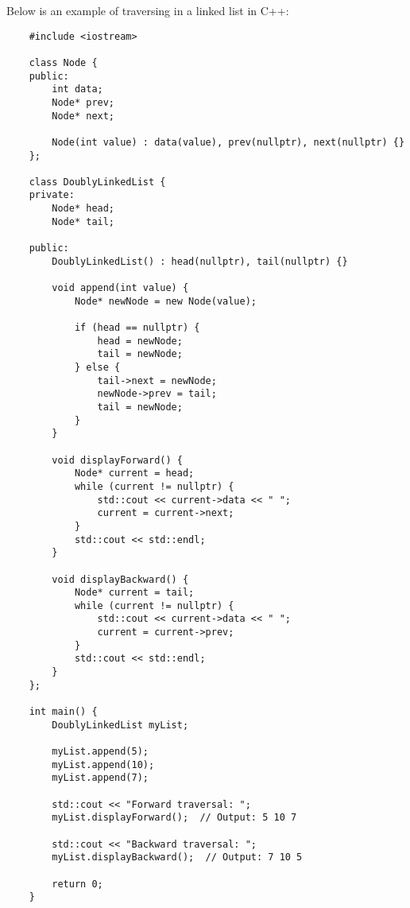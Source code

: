 \begin{solution}
    Below is an example of traversing in a linked list in C++:

    \horizontalline

    \begin{verbatim}
    #include <iostream>

    class Node {
    public:
        int data;
        Node* prev;
        Node* next;
    
        Node(int value) : data(value), prev(nullptr), next(nullptr) {}
    };
    
    class DoublyLinkedList {
    private:
        Node* head;
        Node* tail;
    
    public:
        DoublyLinkedList() : head(nullptr), tail(nullptr) {}
    
        void append(int value) {
            Node* newNode = new Node(value);
    
            if (head == nullptr) {
                head = newNode;
                tail = newNode;
            } else {
                tail->next = newNode;
                newNode->prev = tail;
                tail = newNode;
            }
        }
    
        void displayForward() {
            Node* current = head;
            while (current != nullptr) {
                std::cout << current->data << " ";
                current = current->next;
            }
            std::cout << std::endl;
        }
    
        void displayBackward() {
            Node* current = tail;
            while (current != nullptr) {
                std::cout << current->data << " ";
                current = current->prev;
            }
            std::cout << std::endl;
        }
    };
    
    int main() {
        DoublyLinkedList myList;
    
        myList.append(5);
        myList.append(10);
        myList.append(7);
    
        std::cout << "Forward traversal: ";
        myList.displayForward();  // Output: 5 10 7
    
        std::cout << "Backward traversal: ";
        myList.displayBackward();  // Output: 7 10 5
    
        return 0;
    }        
    \end{verbatim}

    \horizontalline


\end{solution}
